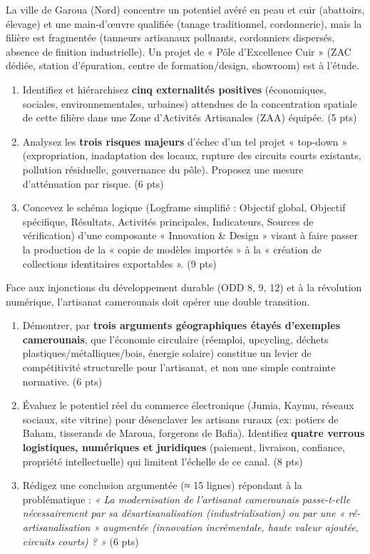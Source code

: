 \documentclass[11pt]{article}
\begin{document}
\begin{exercice}
La ville de Garoua (Nord) concentre un potentiel avéré en peau et cuir (abattoirs, élevage) et une main-d'œuvre qualifiée (tanage traditionnel, cordonnerie), mais la filière est fragmentée (tanneurs artisanaux polluants, cordonniers dispersés, absence de finition industrielle). Un projet de « Pôle d'Excellence Cuir » (ZAC dédiée, station d'épuration, centre de formation/design, showroom) est à l'étude.
\begin{enumerate}
    \item Identifiez et hiérarchisez \textbf{cinq externalités positives} (économiques, sociales, environnementales, urbaines) attendues de la concentration spatiale de cette filière dans une Zone d'Activités Artisanales (ZAA) équipée. (5 pts)
    \item Analysez les \textbf{trois risques majeurs} d'échec d'un tel projet « top-down » (expropriation, inadaptation des locaux, rupture des circuits courts existants, pollution résiduelle, gouvernance du pôle). Proposez une mesure d'atténuation par risque. (6 pts)
    \item Concevez le schéma logique (Logframe simplifié : Objectif global, Objectif spécifique, Résultats, Activités principales, Indicateurs, Sources de vérification) d'une composante « Innovation \& Design » visant à faire passer la production de la « copie de modèles importés » à la « création de collections identitaires exportables ». (9 pts)
\end{enumerate}
\end{exercice}

\begin{exercice}
Face aux injonctions du développement durable (ODD 8, 9, 12) et à la révolution numérique, l'artisanat camerounais doit opérer une double transition.
\begin{enumerate}
    \item Démontrer, par \textbf{trois arguments géographiques étayés d'exemples camerounais}, que l'économie circulaire (réemploi, upcycling, déchets plastiques/métalliques/bois, énergie solaire) constitue un levier de compétitivité structurelle pour l'artisanat, et non une simple contrainte normative. (6 pts)
    \item Évaluez le potentiel réel du commerce électronique (Jumia, Kaymu, réseaux sociaux, site vitrine) pour désenclaver les artisans ruraux (ex: potiers de Baham, tisserands de Maroua, forgerons de Bafia). Identifiez \textbf{quatre verrous logistiques, numériques et juridiques} (paiement, livraison, confiance, propriété intellectuelle) qui limitent l'échelle de ce canal. (8 pts)
    \item Rédigez une conclusion argumentée (≈ 15 lignes) répondant à la problématique : \textit{« La modernisation de l'artisanat camerounais passe-t-elle nécessairement par sa désartisanalisation (industrialisation) ou par une « ré-artisanalisation » augmentée (innovation incrémentale, haute valeur ajoutée, circuits courts) ? »} (6 pts)
\end{enumerate}
\end{exercice}
\end{document}
